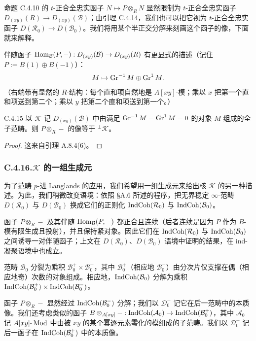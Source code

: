 命题 C.4.10 的 $t$-正合全忠实函子 $N\mapsto P\otimes_R N$ 显然限制为 $t$-正合全忠实函子 $D_{(xy)}(R)\to D_{(xy)}(\mathcal B)$；由引理 C.4.14，我们也可以把它视为 $t$-正合全忠实函子 $D(\mathcal R_0)\to D(\mathcal B_0)$。我们将用某个半正交分解来刻画这个函子的像，下面就来解释。

伴随函子 $\operatorname{Hom}_{\mathcal B}(P,-):D_{(xy)}(\mathcal B)\to D_{(xy)}(R)$ 有更显式的描述（记住 $P:=B(1)\oplus B(-1)$）：
\[
M\mapsto\operatorname{Gr}^{-1}M\oplus\operatorname{Gr}^1M.
\]
（右端带有显然的 $R$-结构：每个直和项自然地是 $A[xy]$-模；乘以 $x$ 把第一个直和项送到第二个；乘以 $y$ 把第二个直和项送到第一个。）

\begin{prop}{C.4.15}\label{thm:a4-19-17}
以 $\mathcal K$ 记 $D_{(xy)}(\mathcal B)$ 中由满足 $\operatorname{Gr}^{-1}M=\operatorname{Gr}^1M=0$ 的对象 $M$ 组成的全子范畴。则 $P\otimes_R-$ 的像等于 ${}^{\perp}\mathcal K$。
\end{prop}

\begin{proof}
这来自引理 A.8.4(6)。
\end{proof}

\subsubsection*{C.4.16.\quad $\mathcal K$ 的一组生成元}

为了范畴 $p$-进 Langlands 的应用，我们希望用一组生成元来给出核 $\mathcal K$ 的另一种描述。为此，我们稍微改变语境：依照 §A.6 所述的程序，把无界稳定 $\infty$-范畴 $D(\mathcal R_0)$ 与 $D(\mathcal B_0)$ 换成它们的正则化 $\operatorname{IndCoh}(\mathcal R_0)$ 与 $\operatorname{IndCoh}(\mathcal B_0)$。

函子 $P\otimes_R-$ 及其伴随 $\operatorname{Hom}_{\mathcal B}(P,-)$ 都正合且连续（后者连续是因为 $P$ 作为 $B$-模有限生成且投射），并且保持紧对象。因此它们在 $\operatorname{IndCoh}(\mathcal R_0)$ 与 $\operatorname{IndCoh}(\mathcal B_0)$ 之间诱导一对伴随函子；上文在 $D(\mathcal R_0)$、$D(\mathcal B_0)$ 语境中证明的结果，在 ind-凝聚语境中也成立。

范畴 $\mathcal B_0$ 分裂为乘积 $\mathcal B_0^+\times\mathcal B_0^-$，其中 $\mathcal B_0^+$（相应地 $\mathcal B_0^-$）由分次片仅支撑在偶（相应地奇）次数的对象组成。相应地，$\operatorname{IndCoh}(\mathcal B_0)$ 分解为乘积 $\operatorname{IndCoh}(\mathcal B_0^+)\times\operatorname{IndCoh}(\mathcal B_0^-)$。

函子 $P\otimes_R-$ 显然经过 $\operatorname{IndCoh}(\mathcal B_0^-)$ 分解；我们以 $\mathcal D_0^-$ 记它在后一范畴中的本质像。我们还考虑类似的函子 $B\otimes_{A[xy]}-:\operatorname{IndCoh}(\mathcal A_0)\to\operatorname{IndCoh}(\mathcal B_0^+)$，其中 $\mathcal A_0$ 记 $A[xy]\text{-}\operatorname{Mod}$ 中由被 $xy$ 的某个幂逐元素零化的模组成的子范畴。我们以 $\mathcal D_0^+$ 记后一函子在 $\operatorname{IndCoh}(\mathcal B_0^+)$ 中的本质像。

